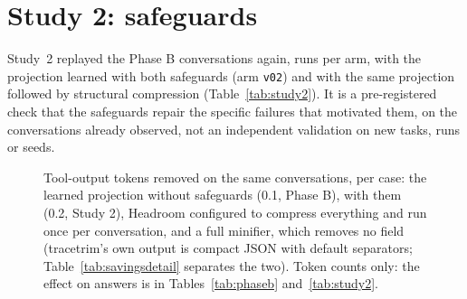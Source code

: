 \section{Study 2: safeguards}
\label{sec:study2}

Study~2 replayed the Phase B conversations again, \StudyTwoRunsPerArm{} runs per arm, with the projection learned
with both safeguards (arm \texttt{v02}) and with the same projection followed by structural compression
(Table~\ref{tab:study2}). It is a pre-registered check that the safeguards repair the specific failures that
motivated them, on the conversations already observed, not an independent validation on new tasks, runs or seeds.

\begin{table}[t]
\centering\small
\resizebox{\textwidth}{!}{}
\caption{Study 2: replay of the same runs as Phase B, \StudyTwoRunsPerArm{} runs per arm, safeguards S1 and S2 on.
Columns as in Table~\ref{tab:phaseb}. No cell carries that table's asterisk, but the same caveat applies: in
billing support the \texttt{v02} arm meets H2 under the frozen keyword test, not under the strict test added after
the fact (deviation 11; see the text).}
\label{tab:study2}
\end{table}

\begin{figure}[t]
\centering

\caption{Tool-output tokens removed on the same conversations, per case: the learned projection without safeguards
(0.1, Phase B), with them (0.2, Study 2), Headroom \HeadroomVersion{} configured to compress everything and run once
per conversation, and a full minifier, which removes no field (tracetrim's own output is compact JSON with default
separators; Table~\ref{tab:savingsdetail} separates the two). Token counts only: the effect on answers is in
Tables~\ref{tab:phaseb} and~\ref{tab:study2}.}
\label{fig:savings}
\end{figure}

